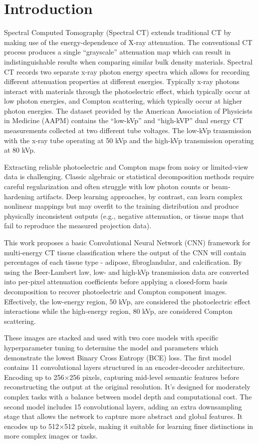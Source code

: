 \section{Introduction}\label{sec:introduction}

Spectral Computed Tomography (Spectral CT) extends traditional CT by making use of the energy-dependence of
X-ray attenuation. The conventional CT process produces a single ``grayscale'' attenuation map which
can result in indistinguishable results when comparing similar bulk density materials. Spectral CT records
two separate x-ray photon energy spectra which allows for recording different attenuation properties
at different energies. Typically x-ray photons interact with materials through the photoelectric effect,
which typically occur at low photon energies, and Compton scattering, which typically occur at higher
photon energies. The dataset provided by the American Association of Physicists in Medicine (AAPM)
contains the ``low-kVp'' and ``high-kVP'' dual energy CT measurements collected at two different tube
voltages. The low-kVp transmission with the x-ray tube operating at 50 kVp and the high-kVp transmission 
operating at 80 kVp.

Extracting reliable photoelectric and Compton maps from noisy or limited‐view data is challenging. Classic
algebraic or statistical decomposition methods require careful regularization and often struggle with low
photon counts or beam‐hardening artifacts. Deep learning approaches, by contrast, can learn complex nonlinear
mappings but may overfit to the training distribution and produce physically inconsistent outputs (e.g.,
negative attenuation, or tissue maps that fail to reproduce the measured projection data).

This work proposes a basic Convolutional Neural Network (CNN) framework for multi‐energy CT tissue classification
where the output of the CNN will contain percentages of each tissue type - adipose, fibroglandular, and calcification.
By using the Beer-Lambert law, low- and high-kVp transmission data are converted into per-pixel attenuation coefficients
before applying a closed-form basis decomposition to recover photoelectric and Compton component images. Effectively,
the low-energy region, 50 kVp, are considered the photoelectric effect interactions while the high-energy region, 80 kVp, 
are considered Compton scattering. 

These images are stacked and used with two core models with specific hyperparameter tuning to determine the model and
parameters which demonstrate the lowest Binary Cross Entropy (BCE) loss. The first model contains 11 convolutional layers 
structured in an encoder-decoder architecture. Encoding up to 256$\times$256 pixels, capturing mid-level semantic features before 
reconstructing the output at the original resolution. It's designed for moderately complex tasks with a balance between 
model depth and computational cost. The second model includes 15 convolutional layers, adding an extra downsampling stage 
that allows the network to capture more abstract and global features. It encodes up to 512$\times$512 pixels, making it 
suitable for learning finer distinctions in more complex images or tasks.

